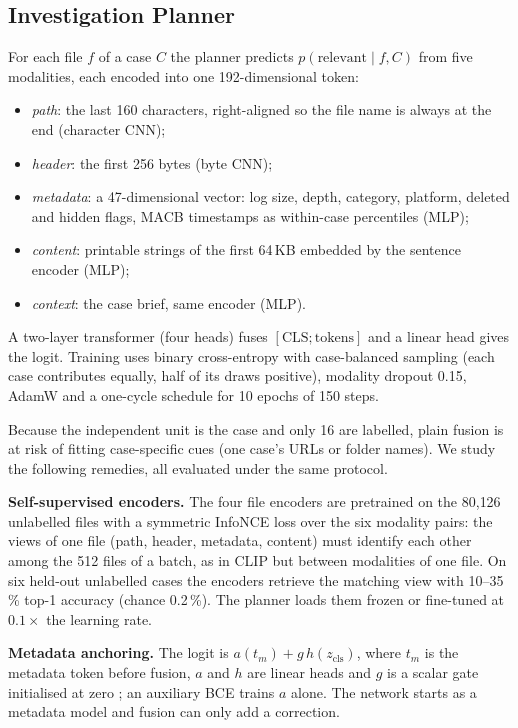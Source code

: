 \documentclass[conference]{IEEEtran}
\begin{document}
\subsection{Investigation Planner}\label{sec:planner}
For each file $f$ of a case $C$ the planner predicts $p(\text{relevant}\mid f, C)$ from five modalities, each encoded
into one 192-dimensional token:
\begin{itemize}
\item \emph{path}: the last 160 characters, right-aligned so the file name is always at the end (character CNN);
\item \emph{header}: the first 256 bytes (byte CNN);
\item \emph{metadata}: a 47-dimensional vector: log size, depth, category, platform, deleted and hidden flags, MACB
timestamps as within-case percentiles (MLP);
\item \emph{content}: printable strings of the first 64\,KB embedded by the sentence encoder (MLP);
\item \emph{context}: the case brief, same encoder (MLP).
\end{itemize}
A two-layer transformer (four heads) fuses $[\text{CLS};\text{tokens}]$ and a linear head gives the logit. Training
uses binary cross-entropy with case-balanced sampling (each case contributes equally, half of its draws positive),
modality dropout 0.15, AdamW and a one-cycle schedule for 10 epochs of 150 steps.

Because the independent unit is the case and only 16 are labelled, plain fusion is at risk of fitting case-specific
cues (one case's URLs or folder names). We study the following remedies, all evaluated under the same protocol.

\textbf{Self-supervised encoders.} The four file encoders are pretrained on the 80{,}126 unlabelled files with a
symmetric InfoNCE loss over the six modality pairs: the views of one file (path, header, metadata, content) must
identify each other among the 512 files of a batch, as in CLIP but between modalities of one file. On six held-out
unlabelled cases the encoders retrieve the matching view with 10--35\,\% top-1 accuracy (chance 0.2\,\%). The
planner loads them frozen or fine-tuned at $0.1\times$ the learning rate.

\textbf{Metadata anchoring.} The logit is $a(t_m)+g\,h(z_{\text{cls}})$, where $t_m$ is the metadata token before
fusion, $a$ and $h$ are linear heads and $g$ is a scalar gate initialised at zero \cite{bachlechner2021}; an auxiliary
BCE trains $a$ alone. The network starts as a metadata model and fusion can only add a correction.
\end{document}
